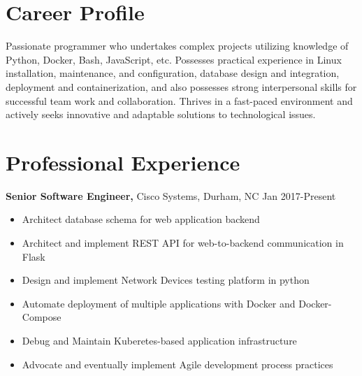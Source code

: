 \documentclass{res}
\begin{document}
 
 
\address{{\bf Present Address} \\ 10110 Strome Ave. Apt 107 \\ Raleigh, NC 27617  \\
        (336) 681-7224 }
\address{{\bf Permanent Address} \\ 114 East Keeling Rd \\ Greensborbo, NC 27410 \\
        (336) 299-7703 }
 
\begin{resume} 

\noindent\makebox[5in]{\rule{6in}{0.4pt}}


\section{Career Profile} 
Passionate programmer who undertakes complex projects utilizing knowledge of Python, Docker, Bash, JavaScript, etc. Possesses practical experience in Linux installation, maintenance, and configuration, database design and integration, deployment and containerization, and also possesses strong interpersonal skills for successful team work and collaboration. Thrives in a fast-paced environment and actively seeks innovative and adaptable solutions to technological issues.

\section{Professional Experience}
  {\bf Senior Software Engineer,} Cisco Systems, Durham, NC \hfill Jan 2017-Present
    \begin{itemize} \itemsep -2pt
      \item Architect database schema for web application backend
      \item Architect and implement REST API for web-to-backend communication in Flask
      \item Design and implement Network Devices testing platform in python
      \item Automate deployment of multiple applications with Docker and Docker-Compose
      \item Debug and Maintain Kuberetes-based application infrastructure
      \item Advocate and eventually implement Agile development process practices
    \end{itemize}


\end{resume}
\end{document}
